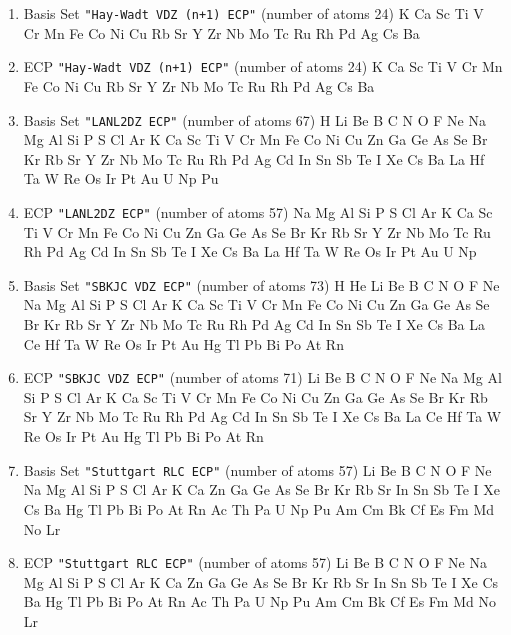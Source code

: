 \begin{enumerate}
\item Basis Set \verb#"Hay-Wadt VDZ (n+1) ECP"# (number of atoms 24)  \newline 
  K Ca Sc Ti V Cr Mn Fe Co Ni Cu Rb Sr Y Zr Nb Mo Tc Ru Rh Pd Ag Cs Ba


\item ECP \verb#"Hay-Wadt VDZ (n+1) ECP"# (number of atoms 24)  \newline 
  K Ca Sc Ti V Cr Mn Fe Co Ni Cu Rb Sr Y Zr Nb Mo Tc Ru Rh Pd Ag Cs Ba


\item Basis Set \verb#"LANL2DZ ECP"# (number of atoms 67)  \newline 
  H Li Be B C N O F Ne Na Mg Al Si P S Cl Ar K Ca Sc Ti V Cr Mn Fe
 Co Ni Cu Zn Ga Ge As Se Br Kr Rb Sr Y Zr Nb Mo Tc Ru Rh Pd Ag Cd In Sn Sb
 Te I Xe Cs Ba La Hf Ta W Re Os Ir Pt Au U Np Pu


\item ECP \verb#"LANL2DZ ECP"# (number of atoms 57)  \newline 
  Na Mg Al Si P S Cl Ar K Ca Sc Ti V Cr Mn Fe Co Ni Cu Zn Ga Ge As Se Br
 Kr Rb Sr Y Zr Nb Mo Tc Ru Rh Pd Ag Cd In Sn Sb Te I Xe Cs Ba La Hf Ta W
 Re Os Ir Pt Au U Np


\item Basis Set \verb#"SBKJC VDZ ECP"# (number of atoms 73)  \newline 
  H He Li Be B C N O F Ne Na Mg Al Si P S Cl Ar K Ca Sc Ti V Cr Mn
 Fe Co Ni Cu Zn Ga Ge As Se Br Kr Rb Sr Y Zr Nb Mo Tc Ru Rh Pd Ag Cd In Sn
 Sb Te I Xe Cs Ba La Ce Hf Ta W Re Os Ir Pt Au Hg Tl Pb Bi Po At Rn


\item ECP \verb#"SBKJC VDZ ECP"# (number of atoms 71)  \newline 
  Li Be B C N O F Ne Na Mg Al Si P S Cl Ar K Ca Sc Ti V Cr Mn Fe Co
 Ni Cu Zn Ga Ge As Se Br Kr Rb Sr Y Zr Nb Mo Tc Ru Rh Pd Ag Cd In Sn Sb Te
 I Xe Cs Ba La Ce Hf Ta W Re Os Ir Pt Au Hg Tl Pb Bi Po At Rn


\item Basis Set \verb#"Stuttgart RLC ECP"# (number of atoms 57)  \newline 
  Li Be B C N O F Ne Na Mg Al Si P S Cl Ar K Ca Zn Ga Ge As Se Br Kr
 Rb Sr In Sn Sb Te I Xe Cs Ba Hg Tl Pb Bi Po At Rn Ac Th Pa U Np Pu Am Cm
 Bk Cf Es Fm Md No Lr


\item ECP \verb#"Stuttgart RLC ECP"# (number of atoms 57)  \newline 
  Li Be B C N O F Ne Na Mg Al Si P S Cl Ar K Ca Zn Ga Ge As Se Br Kr
 Rb Sr In Sn Sb Te I Xe Cs Ba Hg Tl Pb Bi Po At Rn Ac Th Pa U Np Pu Am Cm
 Bk Cf Es Fm Md No Lr



\end{enumerate}
